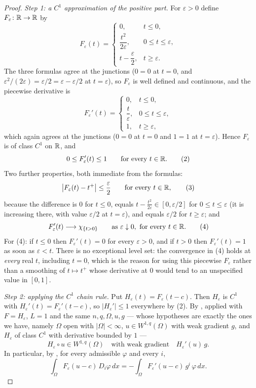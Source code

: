 \begin{proof}
\emph{Step 1: a $C^1$ approximation of the positive part.}  For $\varepsilon>0$
define $F_\varepsilon\colon\mathbb{R}\to\mathbb{R}$ by
\[
F_\varepsilon(t)=
\begin{cases}
0, & t\le0,\\[2pt]
\dfrac{t^2}{2\varepsilon}, & 0\le t\le\varepsilon,\\[6pt]
t-\dfrac{\varepsilon}{2}, & t\ge\varepsilon .
\end{cases}
\]
The three formulas agree at the junctions ($0=0$ at $t=0$, and
$\varepsilon^2/(2\varepsilon)=\varepsilon/2=\varepsilon-\varepsilon/2$ at
$t=\varepsilon$), so $F_\varepsilon$ is well defined and continuous, and the
piecewise derivative is
\[
F_\varepsilon'(t)=
\begin{cases}
0, & t\le0,\\[2pt]
\dfrac{t}{\varepsilon}, & 0\le t\le\varepsilon,\\[6pt]
1, & t\ge\varepsilon ,
\end{cases}
\]
which again agrees at the junctions ($0=0$ at $t=0$ and $1=1$ at
$t=\varepsilon$).  Hence $F_\varepsilon$ is of class $C^1$ on $\mathbb{R}$, and
\[
0\le F_\varepsilon'(t)\le1\qquad\text{for every }t\in\mathbb{R} .
\tag{2}
\]
Two further properties, both immediate from the formulas:
\[
\bigl|F_\varepsilon(t)-t^+\bigr|\le\frac{\varepsilon}2
\qquad\text{for every }t\in\mathbb{R} ,
\tag{3}
\]
because the difference is $0$ for $t\le0$, equals
$t-\frac{t^2}{2\varepsilon}\in[0,\varepsilon/2]$ for $0\le t\le\varepsilon$ (it
is increasing there, with value $\varepsilon/2$ at $t=\varepsilon$), and equals
$\varepsilon/2$ for $t\ge\varepsilon$; and
\[
F_\varepsilon'(t)\longrightarrow\chi_{\{t>0\}}
\qquad\text{as }\varepsilon\downarrow0,\ \text{for every }t\in\mathbb{R} .
\tag{4}
\]
For (4): if $t\le0$ then $F_\varepsilon'(t)=0$ for every $\varepsilon>0$, and if
$t>0$ then $F_\varepsilon'(t)=1$ as soon as $\varepsilon<t$.  There is no
exceptional level set: the convergence in (4) holds at \emph{every} real $t$,
including $t=0$, which is the reason for using this piecewise $F_\varepsilon$
rather than a smoothing of $t\mapsto t^+$ whose derivative at $0$ would tend to
an unspecified value in $[0,1]$.

\emph{Step 2: applying the $C^1$ chain rule.}  Put
$H_\varepsilon(t)=F_\varepsilon(t-c)$.  Then $H_\varepsilon$ is $C^1$ with
$H_\varepsilon'(t)=F_\varepsilon'(t-c)$, so $|H_\varepsilon'|\le1$ everywhere by
(2).  By , applied with $F=H_\varepsilon$, $L=1$ and
the same $n,q,\Omega,u,g$ --- whose hypotheses are exactly the ones we have,
namely $\Omega$ open with $|\Omega|<\infty$, $u\in W^{1,q}(\Omega)$ with weak
gradient $g$, and $H_\varepsilon$ of class $C^1$ with derivative bounded by $1$
---
\[
H_\varepsilon\circ u\in W^{1,q}(\Omega)
\quad\text{with weak gradient}\quad
H_\varepsilon'(u)\,g .
\]
In particular, by , for every admissible $\varphi$
and every $i$,
\[
\int_\Omega F_\varepsilon(u-c)\,D_i\varphi\,dx
=-\int_\Omega F_\varepsilon'(u-c)\,g^i\,\varphi\,dx .
\tag{5}
\]


\end{proof}

